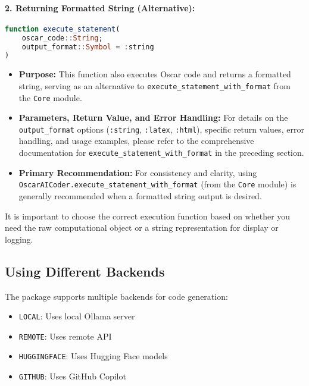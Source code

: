 \documentclass[11pt,a4paper]{article}
\newcommand{\code}[1]{\texttt{#1}}
\newcommand{\func}[1]{\texttt{#1}}
\newcommand{\modname}[1]{\texttt{#1}}
\providecommand{\code}[1]{\texttt{\color{blue!70!black}#1}}
\begin{document}
\paragraph{2. Returning Formatted String (Alternative):}
\begin{lstlisting}[language=Julia, basicstyle=\footnotesize\ttfamily\color{black}, keywordstyle=\color{blue}, commentstyle=\color{green!50!black}, stringstyle=\color{red}]
function execute_statement(
    oscar_code::String;
    output_format::Symbol = :string
)
\end{lstlisting}
\begin{itemize}
    \item \textbf{Purpose:} This function also executes Oscar code and returns a formatted string, serving as an alternative to \func{execute\_statement\_with\_format} from the \modname{Core} module.
    \item \textbf{Parameters, Return Value, and Error Handling:} For details on the \code{output\_format} options (\code{:string}, \code{:latex}, \code{:html}), specific return values, error handling, and usage examples, please refer to the comprehensive documentation for \func{execute\_statement\_with\_format} in the preceding section.
    \item \textbf{Primary Recommendation:} For consistency and clarity, using \func{OscarAICoder.execute\_statement\_with\_format} (from the \modname{Core} module) is generally recommended when a formatted string output is desired.
\end{itemize}

It is important to choose the correct execution function based on whether you need the raw computational object or a string representation for display or logging.


\subsection{Using Different Backends}

The package supports multiple backends for code generation:

\begin{itemize}
    \item \texttt{LOCAL}: Uses local Ollama server
    \item \texttt{REMOTE}: Uses remote API
    \item \texttt{HUGGINGFACE}: Uses Hugging Face models
    \item \texttt{GITHUB}: Uses GitHub Copilot
\end{itemize}
\end{document}
